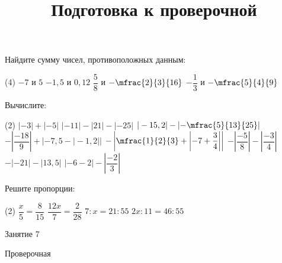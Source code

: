 \begin{homework}[number=3]
	\begin{listofex}
		\item Найдите сумму чисел, противоположных данным:
		\begin{tasks}(4)
			\task \( -7  \) и \( 5 \)
			\task \( -1,5  \) и \( 0,12 \)
			\task \( \dfrac{5}{8}  \) и \( -\mfrac{2}{3}{16} \)
			\task \( -\dfrac{1}{3}  \) и \( -\mfrac{5}{4}{9} \)
		\end{tasks}
		\item Вычислите:
		\begin{tasks}(2)
			\task \(  |-3|+|-5| \)
			\task \( |-11|-|21|-|-25|  \)
			\task \(  |-15,2|-\left|-\mfrac{5}{13}{25}\right| \)
			\task \(  -\left|\dfrac{-18}{9}\right| + |-7,5-|-1,2|| \)
			\task \(  -\left|\mfrac{1}{2}{3} + \left|-7+\dfrac{3}{4}\right|\right| \)
			\task \(  -\left|\dfrac{-5}{8}\right|-\left|\dfrac{-3}{4}\right| \)
			\task \(  -|-21|-|13,5| \)
			\task \( |-6-2| - \left|\dfrac{-2}{3}\right|  \)
		\end{tasks}
		\item Решите пропорции:
		\begin{tasks}(2)
			\task \( \dfrac{x}{5}=\dfrac{8}{15} \)
			\task \( \dfrac{12x}{7}=\dfrac{2}{28} \)
			\task \( 7:x=21:55\)
			\task \( 2x:11=46:55\)
		\end{tasks}
	\end{listofex}
\end{homework}

\begin{class}[number=7]
	\title{Подготовка к проверочной}
	\begin{listofex}
		\item Занятие 7
	\end{listofex}
\end{class}

\begin{exam}
	\begin{listofex}
		\item Проверочная
	\end{listofex}
\end{exam}
